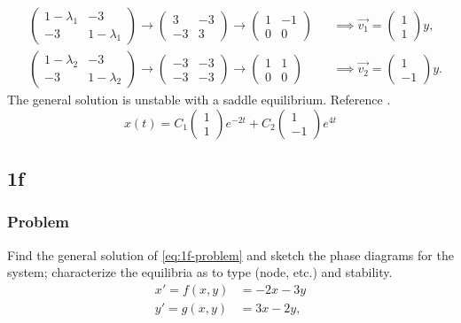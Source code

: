 \documentclass[12pt]{article}
\begin{document}
\begin{equation*}
  \begin{aligned}
    &\begin{pmatrix}1-\lambda_1&-3\\-3&1-\lambda_1\end{pmatrix}
    \rightarrow\begin{pmatrix}3&-3\\-3&3\end{pmatrix}
    \rightarrow\begin{pmatrix}1&-1\\0&0\end{pmatrix}
    &&\implies \vec{v_1} = \begin{pmatrix}1\\1\end{pmatrix}y, \\
    &\begin{pmatrix}1-\lambda_2&-3\\-3&1-\lambda_2\end{pmatrix}
    \rightarrow\begin{pmatrix}-3&-3\\-3&-3\end{pmatrix}
    \rightarrow\begin{pmatrix}1&1\\0&0\end{pmatrix}
    &&\implies \vec{v_2} = \begin{pmatrix}1\\-1\end{pmatrix}y.
  \end{aligned}
\end{equation*}
The general solution is unstable with a saddle equilibrium. Reference \todo[figure].
$$\boxed{x(t)=C_1\begin{pmatrix}1\\1\end{pmatrix}e^{-2t}+C_2\begin{pmatrix}1\\-1\end{pmatrix}e^{4t}}$$

\newpage
\subsection{1f}
\subsubsection*{Problem}
Find the general solution of \cref{eq:1f-problem} and sketch the phase diagrams
for the system; characterize the equilibria as to type (node, etc.) and
stability.
\begin{equation}
  \label{eq:1f-problem}
  \begin{aligned}
    x'=f(x,y)&=-2x-3y\\
    y'=g(x,y)&=3x-2y,\\
  \end{aligned}
\end{equation}
\end{document}
